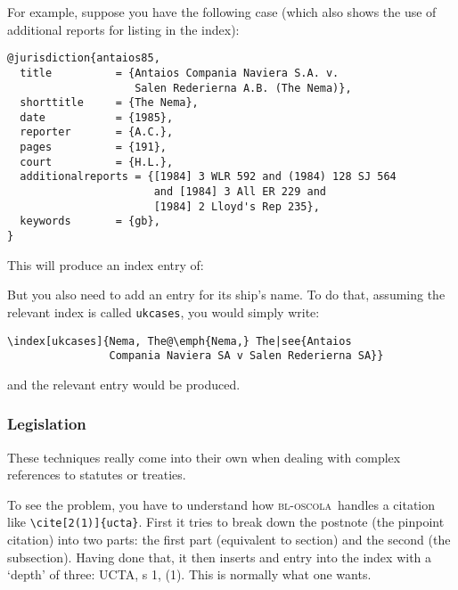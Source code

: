 \documentclass[a5paper,fontsize=9pt,DIV=1]{scrartcl}
\newcommand{\oscola}{\textsc{bl-oscola}}
\newcounter{egcounter}\setcounter{egcounter}{0}
\newenvironment{bibexample}[1][]{%
  \medskip\par\small\noindent\ignorespaces
  \marginpar{[\refstepcounter{egcounter}\arabic{egcounter}]\label{#1}}
  \begin{minipage}[t]{0.95\linewidth}}
 {\end{minipage}\par\medskip}
\begin{document}
For example, suppose you have the following case (which also
shows the use of additional reports for listing in the index):
\begin{bibexample}[antaios85]
\begin{verbatim}
@jurisdiction{antaios85,
  title          = {Antaios Compania Naviera S.A. v. 
                    Salen Rederierna A.B. (The Nema)},
  shorttitle     = {The Nema},
  date           = {1985},
  reporter       = {A.C.},
  pages          = {191},
  court          = {H.L.},
  additionalreports = {[1984] 3 WLR 592 and (1984) 128 SJ 564 
                       and [1984] 3 All ER 229 and 
                       [1984] 2 Lloyd's Rep 235},
  keywords       = {gb},
}
\end{verbatim}
\end{bibexample}

This will produce an index entry of:
\begin{quote}
\end{quote}\label{index:format}

But you also need to add an entry for its ship's name. To do that, assuming the relevant index is called \texttt{ukcases}, you would simply write:
\begin{verbatim}
\index[ukcases]{Nema, The@\emph{Nema,} The|see{Antaios 
                Compania Naviera SA v Salen Rederierna SA}}
\end{verbatim}
and the relevant entry would be produced.

\subsubsection{Legislation}

These techniques really come into their own when dealing with complex
references to statutes or treaties.

To see the problem, you have to understand how \oscola\ handles a
citation like \verb|\cite[2(1)]{ucta}|. First it tries to break down
the postnote (the pinpoint citation) into two parts: the first part
(equivalent to section) and the second (the subsection). Having done
that, it then inserts and entry into the index with a `depth' of
three: UCTA, s 1, (1). This is normally what one wants.
\end{document}
